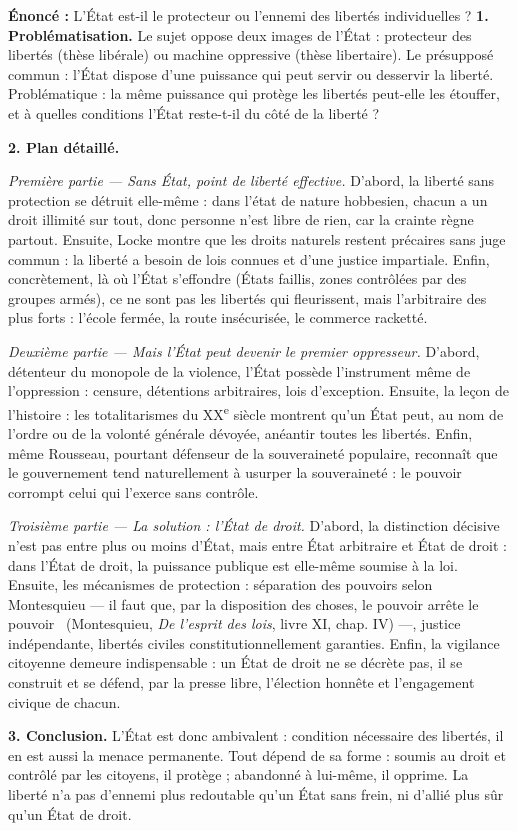 \documentclass[11pt]{article}
\newcommand{\cle}[1]{{\popxbold\color{popdark}#1}}
\begin{document}
\begin{exoresolu}
\textbf{Énoncé :} L'État est-il le protecteur ou l'ennemi des libertés individuelles ?
\tcblower
\textbf{1. Problématisation.} Le sujet oppose deux images de l'État : protecteur des libertés (thèse libérale) ou machine oppressive (thèse libertaire). Le présupposé commun : l'État dispose d'une puissance qui peut servir ou desservir la liberté. Problématique : la même puissance qui protège les libertés peut-elle les étouffer, et à quelles conditions l'État reste-t-il du côté de la liberté ?

\textbf{2. Plan détaillé.}

\emph{Première partie — Sans État, point de liberté effective.} D'abord, la liberté sans protection se détruit elle-même : dans l'état de nature hobbesien, chacun a un droit illimité sur tout, donc personne n'est libre de rien, car la crainte règne partout. Ensuite, Locke montre que les droits naturels restent précaires sans juge commun : la liberté a besoin de lois connues et d'une justice impartiale. Enfin, concrètement, là où l'État s'effondre (États faillis, zones contrôlées par des groupes armés), ce ne sont pas les libertés qui fleurissent, mais l'arbitraire des plus forts : l'école fermée, la route insécurisée, le commerce racketté.

\emph{Deuxième partie — Mais l'État peut devenir le premier oppresseur.} D'abord, détenteur du monopole de la violence, l'État possède l'instrument même de l'oppression : censure, détentions arbitraires, lois d'exception. Ensuite, la leçon de l'histoire : les totalitarismes du XX\textsuperscript{e} siècle montrent qu'un État peut, au nom de l'ordre ou de la volonté générale dévoyée, anéantir toutes les libertés. Enfin, même Rousseau, pourtant défenseur de la souveraineté populaire, reconnaît que le gouvernement tend naturellement à usurper la souveraineté : le pouvoir corrompt celui qui l'exerce sans contrôle.

\emph{Troisième partie — La solution : l'\cle{État de droit}.} D'abord, la distinction décisive n'est pas entre plus ou moins d'État, mais entre État arbitraire et État de droit : dans l'État de droit, la puissance publique est elle-même soumise à la loi. Ensuite, les mécanismes de protection : séparation des pouvoirs selon Montesquieu — \guillemotleft il faut que, par la disposition des choses, le pouvoir arrête le pouvoir \guillemotright\ (Montesquieu, \emph{De l'esprit des lois}, livre XI, chap. IV) —, justice indépendante, libertés civiles constitutionnellement garanties. Enfin, la vigilance citoyenne demeure indispensable : un État de droit ne se décrète pas, il se construit et se défend, par la presse libre, l'élection honnête et l'engagement civique de chacun.

\textbf{3. Conclusion.} L'État est donc ambivalent : condition nécessaire des libertés, il en est aussi la menace permanente. Tout dépend de sa forme : soumis au droit et contrôlé par les citoyens, il protège ; abandonné à lui-même, il opprime. La liberté n'a pas d'ennemi plus redoutable qu'un État sans frein, ni d'allié plus sûr qu'un État de droit.
\end{exoresolu}
\end{document}
